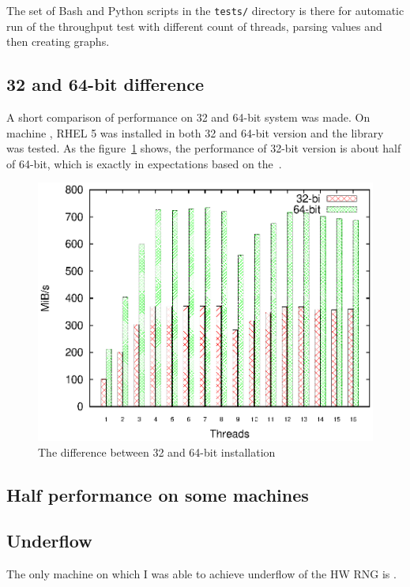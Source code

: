 The set of Bash and Python scripts in the {\tt tests/} directory is there for automatic run of the throughput test with different count of threads, parsing values and then creating graphs.


\subsection{32 and 64-bit difference}\label{subsec:32vs64}
A short comparison of performance on 32 and 64-bit system was made.
On machine , RHEL 5 was installed in both 32 and 64-bit version and the library was tested. As the figure~\ref{fig:32vs64} shows, the performance of 32-bit version is about half of 64-bit, which is exactly in expectations based on the~.

\begin{figure}[h!]
  \centering
 \includegraphics[width=12cm]{fig/tests/32-64bit.eps} %
\caption{The difference between 32 and 64-bit installation}
\label{fig:32vs64}
\end{figure}

\subsection{Half performance on some machines}

\subsection{Underflow}
The only machine on which I was able to achieve underflow of the HW RNG is .


